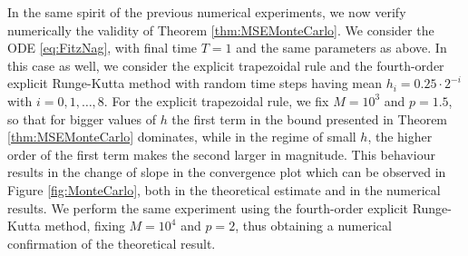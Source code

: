 \documentclass{siamart1116}
\numberwithin{theorem}{section}
\begin{document}
In the same spirit of the previous numerical experiments, we now verify numerically the validity of Theorem \ref{thm:MSEMonteCarlo}. We consider the ODE \eqref{eq:FitzNag}, with final time $T = 1$ and the same parameters as above. In this case as well, we consider the explicit trapezoidal rule and the fourth-order explicit Runge-Kutta method with random time steps having mean $h_i = 0.25\cdot 2^{-i}$ with $i = 0, 1, \ldots, 8$. For the explicit trapezoidal rule, we fix $M = 10^3$ and $p = 1.5$, so that for bigger values of $h$ the first term in the bound presented in Theorem \ref{thm:MSEMonteCarlo} dominates, while in the regime of small $h$, the higher order of the first term makes the second larger in magnitude. This behaviour results in the change of slope in the convergence plot which can be observed in Figure \ref{fig:MonteCarlo}, both in the theoretical estimate and in the numerical results. We perform the same experiment using the fourth-order explicit Runge-Kutta method, fixing $M = 10^4$ and $p = 2$, thus obtaining a numerical confirmation of the theoretical result.
\end{document}
